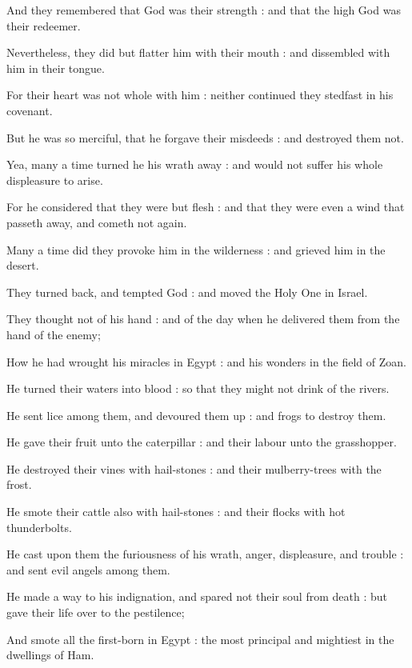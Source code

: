 And they remembered that God was their strength : and that the high God was their redeemer.\par
{}Nevertheless, they did but flatter him with their mouth : and dissembled with him in their tongue.\par
{}For their heart was not whole with him : neither continued they stedfast in his covenant.\par
{}But he was so merciful, that he forgave their misdeeds : and destroyed them not.\par
{}Yea, many a time turned he his wrath away : and would not suffer his whole displeasure to arise.\par
{}For he considered that they were but flesh : and that they were even a wind that passeth away, and cometh not again.\par
{}Many a time did they provoke him in the wilderness : and grieved him in the desert.\par
{}They turned back, and tempted God : and moved the Holy One in Israel.\par
{}They thought not of his hand : and of the day when he delivered them from the hand of the enemy;\par
{}How he had wrought his miracles in Egypt : and his wonders in the field of Zoan.\par
{}He turned their waters into blood : so that they might not drink of the rivers.\par
{}He sent lice among them, and devoured them up : and frogs to destroy them.\par
{}He gave their fruit unto the caterpillar : and their labour unto the grasshopper.\par
{}He destroyed their vines with hail-stones : and their mulberry-trees with the frost.\par
{}He smote their cattle also with hail-stones : and their flocks with hot thunderbolts.\par
{}He cast upon them the furiousness of his wrath, anger, displeasure, and trouble : and sent evil angels among them.\par
{}He made a way to his indignation, and spared not their soul from death : but gave their life over to the pestilence;\par
{}And smote all the first-born in Egypt : the most principal and mightiest in the dwellings of Ham.\par
